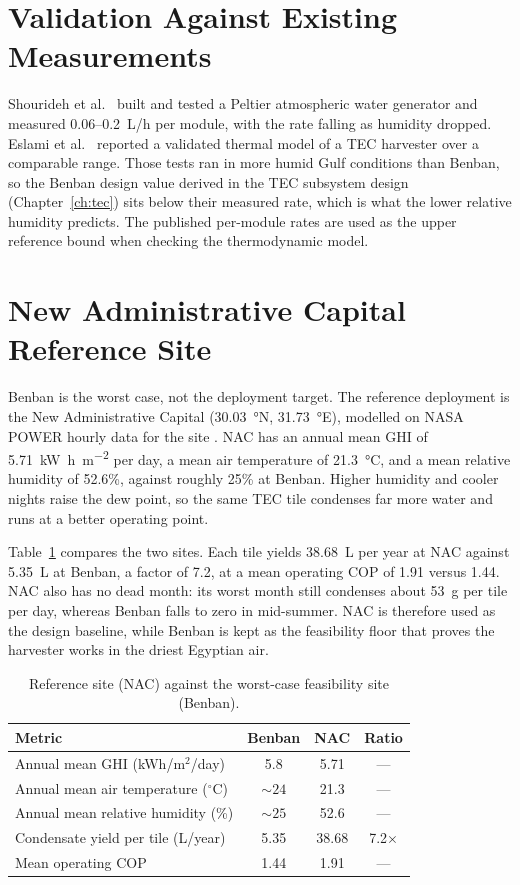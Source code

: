 \documentclass[12pt,a4paper]{report}   %
\begin{document}
\section{Validation Against Existing Measurements}

Shourideh et al.\ \cite{shourideh2021tec} built and tested a Peltier atmospheric water
generator and measured 0.06--0.2~L/h per module, with the rate falling as humidity
dropped. Eslami et al.\ \cite{eslami2021tec} reported a validated thermal model of a TEC
harvester over a comparable range. Those tests ran in more humid Gulf conditions than
Benban, so the Benban design value derived in the TEC subsystem design
(Chapter~\ref{ch:tec}) sits below their measured rate, which is what the lower relative
humidity predicts. The published per-module rates are used as the upper reference bound
when checking the thermodynamic model.

\section{New Administrative Capital Reference Site}

Benban is the worst case, not the deployment target. The reference deployment is the New
Administrative Capital (\SI{30.03}{\degree}N, \SI{31.73}{\degree}E), modelled on NASA
POWER hourly data for the site \cite{nasa_power_nac2025}. NAC has an annual mean GHI of
\SI{5.71}{\kilo\watt\hour\per\metre\squared} per day, a mean air temperature of
\SI{21.3}{\degreeCelsius}, and a mean relative humidity of 52.6\%, against roughly 25\%
at Benban. Higher humidity and cooler nights raise the dew point, so the same TEC tile
condenses far more water and runs at a better operating point.

Table~\ref{tab:nac_vs_benban} compares the two sites. Each tile yields
\SI{38.68}{\liter} per year at NAC against \SI{5.35}{\liter} at Benban, a factor of 7.2,
at a mean operating COP of 1.91 versus 1.44. NAC also has no dead month: its worst month
still condenses about \SI{53}{\gram} per tile per day, whereas Benban falls to zero in
mid-summer. NAC is therefore used as the design baseline, while Benban is kept as the
feasibility floor that proves the harvester works in the driest Egyptian air.

\begin{table}[htbp]
\centering
\caption{Reference site (NAC) against the worst-case feasibility site (Benban).}
\label{tab:nac_vs_benban}
\begin{tabular}{lccc}
\toprule
\textbf{Metric} & \textbf{Benban} & \textbf{NAC} & \textbf{Ratio} \\
\midrule
Annual mean GHI (kWh/m$^2$/day) & 5.8 & 5.71 & --- \\
Annual mean air temperature ($^\circ$C) & ${\sim}24$ & 21.3 & --- \\
Annual mean relative humidity (\%) & ${\sim}25$ & 52.6 & --- \\
Condensate yield per tile (L/year) & 5.35 & 38.68 & 7.2$\times$ \\
Mean operating COP & 1.44 & 1.91 & --- \\
\bottomrule
\end{tabular}
\end{table}
\end{document}
